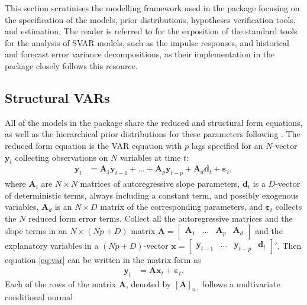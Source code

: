 \documentclass[
  nojss]{jss}
\begin{document}
This section scrutinises the modelling framework used in the package
focusing on the specification of the models, prior distributions,
hypotheses verification tools, and estimation. The reader is referred to
\citep[][Chapter 4: SVAR Tools]{KL2017} for the exposition of the
standard tools for the analysis of SVAR models, such as the impulse
responses, and historical and forecast error variance decompositions, as
their implementation in the package closely follows this resource.

\subsection{Structural VARs}\label{ssec:svars}

All of the models in the package  share the reduced and
structural form equations, as well as the hierarchical prior
distributions for these parameters following \cite{LSUW2024}. The
reduced form equation is the VAR equation with \(p\) lags specified for
an \(N\)-vector \(\mathbf{y}_t\) collecting observations on \(N\)
variables at time \(t\): \begin{align}
\mathbf{y}_t &= \mathbf{A}_1 \mathbf{y}_{t-1} + \dots + \mathbf{A}_p \mathbf{y}_{t-p} + \mathbf{A}_d \mathbf{d}_t +  \boldsymbol{\varepsilon}_t, \label{eq:var}
\end{align} where \(\mathbf{A}_i\) are \(N\times N\) matrices of
autoregressive slope parameters, \(\mathbf{d}_t\) is a \(D\)-vector of
deterministic terms, always including a constant term, and possibly
exogenous variables, \(\mathbf{A}_d\) is an \(N\times D\) matrix of the
corresponding parameters, and \(\boldsymbol{\varepsilon}_t\) collects
the \(N\) reduced form error terms. Collect all the autoregressive
matrices and the slope terms in an \(N\times (Np+D)\) matrix
\(\mathbf{A} = \begin{bmatrix}\mathbf{A}_1& \dots & \mathbf{A}_p & \mathbf{A}_d\end{bmatrix}\)
and the explanatory variables in a \((Np+D)\)-vector
\(\mathbf{x} = \begin{bmatrix}\mathbf{y}_{t-1} & \dots & \mathbf{y}_{t-p} & \mathbf{d}_{t} \end{bmatrix}'\).
Then equation \eqref{eq:var} can be written in the matrix form as
\begin{align}
\mathbf{y}_t &= \mathbf{A}\mathbf{x}_t + \boldsymbol{\varepsilon}_t. \label{eq:rf}
\end{align} Each of the rows of the matrix \(\mathbf{A}\), denoted by
\([\mathbf{A}]_{n\cdot}\) follows a multivariate conditional normal
\end{document}
